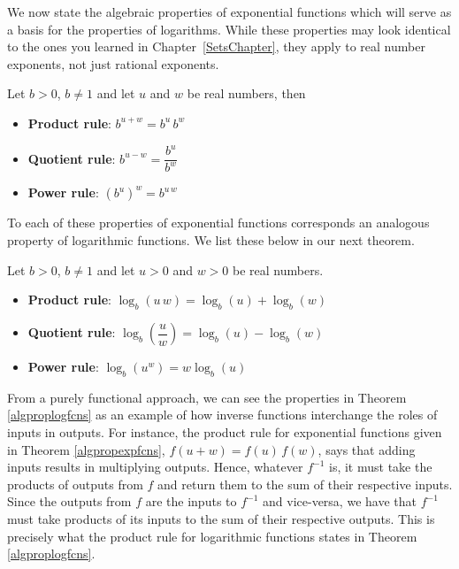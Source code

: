 We now state the algebraic properties of exponential functions which will serve as a basis for the properties of logarithms.  While these properties may look identical to the ones you learned in  Chapter~\ref{SetsChapter}, they apply to real number exponents, not just rational exponents.  


\begin{theorem}  \label{algpropexpfcns}  
Let $b > 0$, $b\neq 1$ and let $u$ and $w$ be real numbers, then 

\begin{itemize}

\item  \textbf{Product rule}:   $b^{u+w} = b^{u}\,b^{w}$

\item  \textbf{Quotient rule}:  $b^{u-w} = \dfrac{b^{u}}{b^{w}}$

\item  \textbf{Power rule}:   $\left(b^{u}\right)^{w} = b^{u\,w}$

\end{itemize}

\end{theorem}


To each of these properties of exponential functions corresponds an analogous property of logarithmic functions.  We list these below in our next theorem.



\begin{theorem}  \label{algproplogfcns} 
 Let $b > 0$, $b\neq 1$ and let $u>0$ and $w>0$ be real numbers. 

\begin{itemize}

\item  \textbf{Product rule}:  $\log_{b}(u\,w) = \log_{b}(u) + \log_{b}(w)$

\item  \textbf{Quotient rule}:  $\log_{b} \left( \dfrac{u}{w} \right) = \log_{b}(u) - \log_{b}(w)$

\item  \textbf{Power rule}:  $\log_{b}\left(u^{w}\right) = w \log_{b}(u)$

\end{itemize}

\end{theorem}

From a purely functional approach, we can see the properties in Theorem \ref{algproplogfcns} as an example of how inverse functions interchange the roles of inputs in outputs.  For instance, the product rule for exponential functions given in Theorem  \ref{algpropexpfcns}, $f(u+w) = f(u)\,f(w)$, says that adding inputs results in multiplying outputs.  Hence, whatever $f^{-1}$ is, it must take the products of outputs from $f$ and return them to the sum of their respective inputs.  Since the outputs from $f$ are the inputs to $f^{-1}$ and vice-versa, we have that $f^{-1}$ must take products of its inputs to the sum of their respective outputs. This is precisely what the product rule for logarithmic functions states in Theorem \ref{algproplogfcns}.


